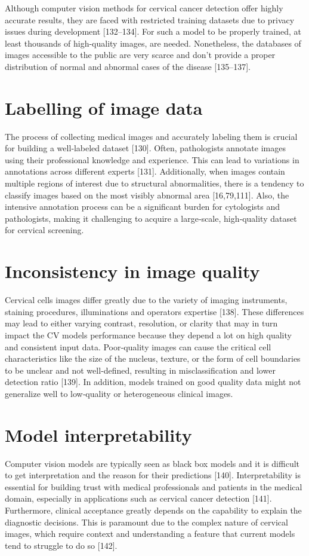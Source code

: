 \documentclass[final,5p,times,twocolumn,authoryear]{elsarticle}
\begin{document}
Although computer vision methods for cervical cancer detection offer highly accurate results, they are faced with restricted training datasets due to privacy issues during development [132–134]. For such a model to be properly trained, at least thousands of high-quality images, are needed. Nonetheless, the databases of images accessible to the public are very scarce and don’t provide a proper distribution of normal and abnormal cases of the disease [135–137].
\section{Labelling of image data}
The process of collecting medical images and accurately labeling them is crucial for building a well‑labeled dataset [130]. Often, pathologists annotate images using their professional knowledge and experience. This can lead to variations in annotations across different experts [131]. Additionally, when images contain multiple regions of interest due to structural abnormalities, there is a tendency to classify images based on the most visibly abnormal area [16,79,111]. Also, the intensive annotation process can be a significant burden for cytologists and pathologists, making it challenging to acquire a large‑scale, high‑quality dataset for cervical screening.
\section{Inconsistency in image quality}
Cervical cells images differ greatly due to the variety of imaging instruments, staining procedures, illuminations and operators expertise [138]. These differences may lead to either varying contrast, resolution, or clarity that may in turn impact the CV models performance because they depend a lot on high quality and consistent input data. Poor‑quality images can cause the critical cell characteristics like the size of the nucleus, texture, or the form of cell boundaries to be unclear and not well‑defined, resulting in misclassification and lower detection ratio [139]. In addition, models trained on good quality data might not generalize well to low‑quality or heterogeneous clinical images.
\section{Model interpretability}
Computer vision models are typically seen as black box models and it is difficult to get interpretation and the reason for their predictions [140]. Interpretability is essential for building trust with medical professionals and patients in the medical domain, especially in applications such as cervical cancer detection [141]. Furthermore, clinical acceptance greatly depends on the capability to explain the diagnostic decisions. This is paramount due to the complex nature of cervical images, which require context and understanding a feature that current models tend to struggle to do so [142].
\end{document}
